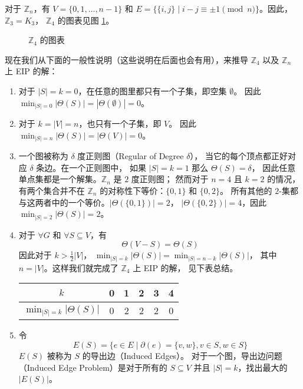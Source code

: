 \documentclass[12pt, a4paper]{article}
\begin{document}
对于 $\mathbb{Z}_n$，有 $V = \{0, 1, \dots, n − 1\}$ 和
$E = \{\{i, j\} \mid i − j \equiv \pm 1 \pmod n\}$。因此，$\mathbb{Z}_3 = K_3$，
$\mathbb{Z}_4$ 的图表见图 \ref{Figure 1}。

\begin{figure}
	\centering
	
	\caption{$\mathbb{Z}_4$ 的图表}
	\label{Figure 1}
\end{figure}

现在我们从下面的一般性说明（这些说明在后面也会有用），来推导 $\mathbb{Z}_4$ 以及
$\mathbb{Z}_n$ 上 EIP 的解：

\begin{enumerate}[(1)]
	\item 对于 $|S| = k = 0$，在任意的图里都只有一个子集，即空集 $\emptyset$。
		因此 $\min_{|S| = 0} |\Theta(S)| = |\Theta(\emptyset)| = 0$。
	\item 对于 $k = |V| = n$，也只有一个子集，即 $V$。
		因此 $\min_{|S| = n} |\Theta(S)| = |\Theta(V)| = 0$。
	\item 一个图被称为 $\delta$ 度正则图（Regular of Degree $\delta$），
		当它的每个顶点都正好对应 $\delta$ 条边。在一个正则图中，
		如果 $|S| = k = 1$ 那么 $\Theta(S) = \delta$，
		因此任意单点集都是一个解集。$\mathbb{Z}_n$ 是 $2$ 度正则图；
		然而对于 $n = 4$ 且 $k = 2$ 的情况，有两个集合并不在 $\mathbb{Z}_n$
		的对称性下等价：$\{0, 1\}$ 和 $\{0, 2\}$。
		所有其他的 $2$-集都与这两者中的一个等价。$|\Theta(\{0, 1\})| = 2$，
		$|\Theta(\{0, 2\})| = 4$，因此 $\min_{|S| = 2} |\Theta(S)| = 2$。
	\item 对于 $\forall G$ 和 $\forall S \subseteq V$，有
		\begin{equation*}
		\Theta(V − S) = \Theta(S)
		\end{equation*}
		因此对于 $k > \frac{1}{2} |V|$，
		$\min_{|S| = k} |\Theta(S)| = \min_{|S| = n − k} |\Theta(S)|$，
		其中 $n = |V|$。这样我们就完成了 $\mathbb{Z}_4$ 上 EIP 的解，
		见下表总结。
		\begin{center}
			\begin{tabular}{ c | c c c c c }
			$k$                          & 0 & 1 & 2 & 3 & 4 \\
			\hline
			$\min_{|S| = k} |\Theta(S)|$ & 0 & 2 & 2 & 2 & 0
			\end{tabular}
		\end{center}
	\item 令
		\begin{equation*}
		E(S) = \{e \in E \mid \partial(e) = \{v, w\}, v \in S, w \in S\}
		\end{equation*}
		$E(S)$ 被称为 $S$ 的导出边（Induced Edges）。
		对于一个图，导出边问题（Induced Edge Problem）是对于所有的
		$S \subseteq V$ 并且 $|S| = k$，找出最大的 $|E(S)|$。
\end{enumerate}
\end{document}
